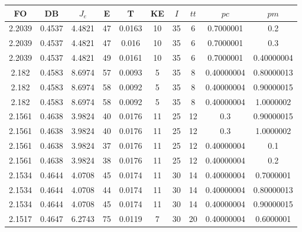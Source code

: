 \begin{table}[h!]
    \footnotesize
    \begin{center}
        \begin{tabular}{|c|c|c|c|c|c|c|c|c|c|}
        \hline
            {\bf FO} & {\bf DB} & $J_e$ & {\bf E} & {\bf T} & {\bf KE} & $I$ & $tt$ & $pc$ & $pm$ \\
        \hline
        \hline
            2.2039 & 0.4537  & 4.4821 & 47 & 0.0163 & 10 & 35 & 6 & 0.7000001 & 0.2\\
        \hline
        \hline
            2.2039 & 0.4537  & 4.4821 & 47 & 0.016 & 10 & 35 & 6 & 0.7000001 & 0.3\\
        \hline
        \hline
            2.2039 & 0.4537  & 4.4821 & 49 & 0.0161 & 10 & 35 & 6 & 0.7000001 & 0.40000004\\
        \hline
        \hline
            2.182 & 0.4583  & 8.6974 & 57 & 0.0093 & 5 & 35 & 8 & 0.40000004 & 0.80000013\\
        \hline
        \hline
            2.182 & 0.4583  & 8.6974 & 58 & 0.0092 & 5 & 35 & 8 & 0.40000004 & 0.90000015\\
        \hline
        \hline
            2.182 & 0.4583  & 8.6974 & 58 & 0.0092 & 5 & 35 & 8 & 0.40000004 & 1.0000002\\
        \hline
        \hline
            2.1561 & 0.4638  & 3.9824 & 40 & 0.0176 & 11 & 25 & 12 & 0.3 & 0.90000015\\
        \hline
        \hline
            2.1561 & 0.4638  & 3.9824 & 40 & 0.0176 & 11 & 25 & 12 & 0.3 & 1.0000002\\
        \hline
        \hline
            2.1561 & 0.4638  & 3.9824 & 37 & 0.0176 & 11 & 25 & 12 & 0.40000004 & 0.1\\
        \hline
        \hline
            2.1561 & 0.4638  & 3.9824 & 38 & 0.0176 & 11 & 25 & 12 & 0.40000004 & 0.2\\
        \hline
        \hline
            2.1534 & 0.4644  & 4.0708 & 45 & 0.0174 & 11 & 30 & 14 & 0.40000004 & 0.7000001\\
        \hline
        \hline
            2.1534 & 0.4644  & 4.0708 & 44 & 0.0174 & 11 & 30 & 14 & 0.40000004 & 0.80000013\\
        \hline
        \hline
            2.1534 & 0.4644  & 4.0708 & 45 & 0.0174 & 11 & 30 & 14 & 0.40000004 & 0.90000015\\
        \hline
        \hline
            2.1517 & 0.4647  & 6.2743 & 75 & 0.0119 & 7 & 30 & 20 & 0.40000004 & 0.6000001\\

\end{tabular}
\end{center}
\end{table}
